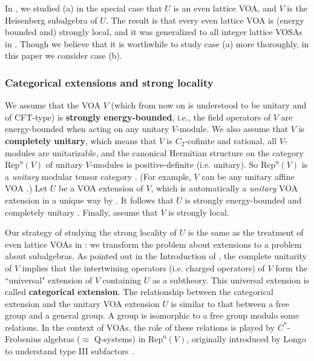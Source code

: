 \documentclass[11pt,b5paper,notitlepage]{article}
\theoremstyle{definition}
\theoremstyle{plain}
\newcommand{\uni}{\mathrm{u}}
\newcommand{\RepV}{{\mathrm{Rep}^\uni(V)}}
\numberwithin{equation}{section}
\begin{document}
In \cite{Gui21a}, we studied (a) in the special case that $U$ is an even lattice VOA, and $V$ is the Heisenberg subalgebra of $U$. The result is that every even lattice VOA is (energy bounded \cite{TL04,Gui19c} and) strongly local, and it was generalized to all integer lattice VOSAs in \cite{CGH23}. Though we believe that it is worthwhile to study case (a) more thoroughly, in this paper we consider case (b).



\subsubsection{Categorical extensions and strong locality}


We assume that the VOA $V$ (which from now on is understood to be unitary and of CFT-type) is \textbf{strongly energy-bounded}, i.e., the field operators of $V$ are energy-bounded when acting on any unitary $V$-module. We also assume that $V$ is \textbf{completely unitary}, which means that $V$ is $C_2$-cofinite and rational, all $V$-modules are unitarizable, and the canonical Hermitian structure on the category $\RepV$ of unitary $V$-modules is positive-definite (i.e. unitary).  So $\RepV$ is a \textit{unitary} modular tensor category \cite{Hua08b,Gui19b}. (For example, $V$ can be any unitary affine VOA \cite{Gui19a,Gui19b,Gui19c,Gui21a,Ten19a,Ten19b,Ten24,Gui20}.) Let $U$ be a VOA extension of $V$, which is automatically a \textit{unitary} VOA extension in a unique way by \cite[Thm. 4.7]{CGGH23}. It follows that $U$ is strongly energy-bounded \cite{CT23} and completely unitary \cite{Gui22}. Finally, assume that $V$ is strongly local.


Our strategy of studying the strong locality of $U$ is the same as the treatment of even lattice VOAs in \cite{Gui21a}: we transform the problem about extensions to a problem about subalgebras. As pointed out in the Introduction of \cite{Gui21a}, the complete unitarity of $V$ implies that the intertwining operators (i.e. charged operators) of $V$ form the ``universal" extension of $V$ containing $U$ as a subtheory. This universal extension is called \textbf{categorical extension}. The relationship between the categorical extension and the unitary VOA extension $U$ is similar to that between a free group and a general group. A group is isomorphic to a free group modulo some relations. In the context of VOAs, the role of these relations is played by $C^*$-Frobenius algebras ($\approx$ Q-systems) in $\RepV$, originally introduced by Longo to understand type III subfactors \cite{Lon94}.
\end{document}
